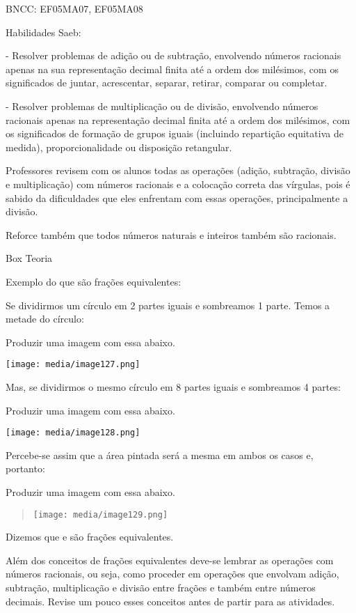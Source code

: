 BNCC: EF05MA07, EF05MA08

Habilidades Saeb:

- Resolver problemas de adição ou de subtração, envolvendo números
racionais apenas na sua representação decimal finita até a ordem dos
milésimos, com os significados de juntar, acrescentar, separar, retirar,
comparar ou completar.

- Resolver problemas de multiplicação ou de divisão, envolvendo números
racionais apenas na representação decimal finita até a ordem dos
milésimos, com os significados de formação de grupos iguais (incluindo
repartição equitativa de medida), proporcionalidade ou disposição
retangular.

Professores revisem com os alunos todas as operações (adição, subtração,
divisão e multiplicação) com números racionais e a colocação correta das
vírgulas, pois é sabido da dificuldades que eles enfrentam com essas
operações, principalmente a divisão.

Reforce também que todos números naturais e inteiros também são
racionais.

Box Teoria

Exemplo do que são frações equivalentes:

Se dividirmos um círculo em 2 partes iguais e sombreamos 1 parte. Temos
a metade do círculo:

Produzir uma imagem com essa abaixo.

\texttt{[image: media/image127.png]}

Mas, se dividirmos o mesmo círculo em 8 partes iguais e sombreamos 4
partes:

Produzir uma imagem com essa abaixo.

\texttt{[image: media/image128.png]}

Percebe-se assim que a área pintada será a mesma em ambos os casos e,
portanto:

Produzir uma imagem com essa abaixo.

\begin{quote}
\texttt{[image: media/image129.png]}
\end{quote}

Dizemos que e são frações equivalentes.

Além dos conceitos de frações equivalentes deve-se lembrar as operações
com números racionais, ou seja, como proceder em operações que envolvam
adição, subtração, multiplicação e divisão entre frações e também entre
números decimais. Revise um pouco esses conceitos antes de partir para
as atividades.

